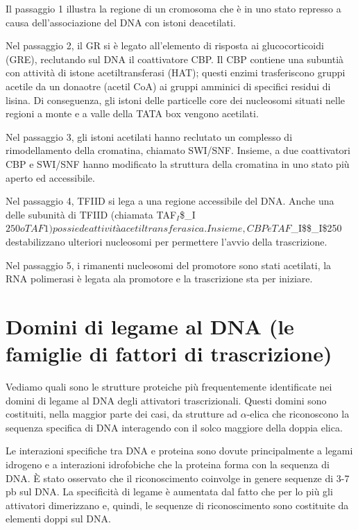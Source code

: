 \documentclass[11pt]{book}
\begin{document}
Il passaggio 1 illustra la regione di un cromosoma che è in uno stato
represso a causa dell'associazione del DNA con istoni deacetilati.

Nel passaggio 2, il GR si è legato all'elemento di risposta ai
glucocorticoidi (GRE), reclutando sul DNA il coattivatore CBP. Il CBP
contiene una subuntià con attività di istone acetiltransferasi (HAT);
questi enzimi trasferiscono gruppi acetile da un donaotre (acetil CoA)
ai gruppi amminici di specifici residui di lisina. Di conseguenza, gli
istoni delle particelle core dei nucleosomi situati nelle regioni a
monte e a valle della TATA box vengono acetilati.

Nel passaggio 3, gli istoni acetilati hanno reclutato un complesso di
rimodellamento della cromatina, chiamato SWI/SNF. Insieme, a due
coattivatori CBP e SWI/SNF hanno modificato la struttura della cromatina
in uno stato più aperto ed accessibile.

Nel passaggio 4, TFIID si lega a una regione accessibile del DNA. Anche
una delle subunità di TFIID (chiamata
TAF\(_I\)\$\_I\(250 o TAF1) possiede attività acetiltransferasica. Insieme, CBP e TAF\)\_I\$\$\_I\$250
destabilizzano ulteriori nucleosomi per permettere l'avvio della
trascrizione.

Nel passaggio 5, i rimanenti nucleosomi del promotore sono stati
acetilati, la RNA polimerasi è legata ala promotore e la trascrizione
sta per iniziare.

\section{Domini di legame al DNA (le famiglie di fattori di
trascrizione)}\label{domini-di-legame-al-dna-le-famiglie-di-fattori-di-trascrizione}

Vediamo quali sono le strutture proteiche più frequentemente
identificate nei domini di legame al DNA degli attivatori
trascrizionali. Questi domini sono costituiti, nella maggior parte dei
casi, da strutture ad \(\alpha\)-elica che riconoscono la sequenza
specifica di DNA interagendo con il solco maggiore della doppia elica.

Le interazioni specifiche tra DNA e proteina sono dovute principalmente
a legami idrogeno e a interazioni idrofobiche che la proteina forma con
la sequenza di DNA. È stato osservato che il riconoscimento coinvolge
in genere sequenze di 3-7 pb sul DNA. La specificità di legame è
aumentata dal fatto che per lo più gli attivatori dimerizzano e, quindi,
le sequenze di riconoscimento sono costituite da elementi doppi sul DNA.
\end{document}
